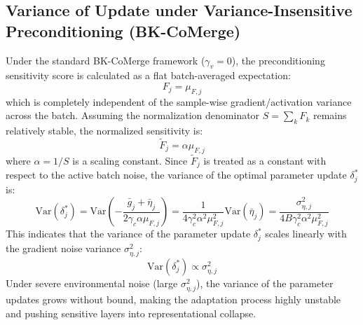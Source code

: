 \documentclass{article}
\theoremstyle{plain}
\theoremstyle{definition}
\theoremstyle{remark}
\begin{document}
\subsection{Variance of Update under Variance-Insensitive Preconditioning (BK-CoMerge)}
Under the standard BK-CoMerge framework ($\gamma_v = 0$), the preconditioning sensitivity score is calculated as a flat batch-averaged expectation:
\begin{equation}
    F_j = \mu_{F, j}
\end{equation}
which is completely independent of the sample-wise gradient/activation variance across the batch. Assuming the normalization denominator $S = \sum_k F_k$ remains relatively stable, the normalized sensitivity is:
\begin{equation}
    \tilde{F}_j = \alpha \mu_{F, j}
\end{equation}
where $\alpha = 1/S$ is a scaling constant. Since $\tilde{F}_j$ is treated as a constant with respect to the active batch noise, the variance of the optimal parameter update $\delta_j^*$ is:
\begin{equation}
    \mathrm{Var}(\delta_j^*) = \mathrm{Var}\left( -\frac{\bar{g}_j + \bar{\eta}_j}{2 \gamma_c \alpha \mu_{F, j}} \right) = \frac{1}{4 \gamma_c^2 \alpha^2 \mu_{F, j}^2} \mathrm{Var}(\bar{\eta}_j) = \frac{\sigma_{\eta, j}^2}{4 B \gamma_c^2 \alpha^2 \mu_{F, j}^2}
\end{equation}
This indicates that the variance of the parameter update $\delta_j^*$ scales linearly with the gradient noise variance $\sigma_{\eta, j}^2$:
\begin{equation}
    \mathrm{Var}(\delta_j^*) \propto \sigma_{\eta, j}^2
\end{equation}
Under severe environmental noise (large $\sigma_{\eta, j}^2$), the variance of the parameter updates grows without bound, making the adaptation process highly unstable and pushing sensitive layers into representational collapse.
\end{document}
